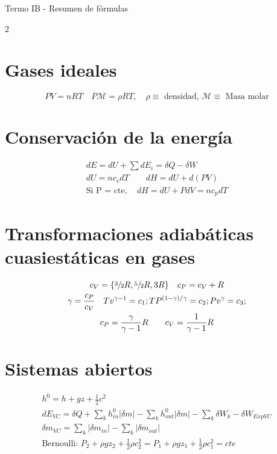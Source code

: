 \documentclass[9pt]{article}
\begin{document}
\begin{center}
    {\Large{Termo IB - Resumen de fórmulas}}
\end{center}

\begin{multicols}{2}



\section{Gases ideales}
\begin{equation*}
    PV = nRT \quad P\mathcal{M}  = \rho RT,\quad \text{$\rho\equiv$ densidad, $\mathcal{M}\equiv$ Masa molar}
\end{equation*}

\section{Conservación de la energía}

\begin{gather*}
    dE = dU + \sum dE_{i} = \delta Q - \delta W\\
    dU = nc_vdT \qquad dH = dU + d(PV)\\
    \text{Si P = cte},\quad dH = dU +PdV = nc_pdT
\end{gather*}

\section{Transformaciones adiabáticas cuasiestáticas en gases}
\begin{gather*}
    c_V = \{\sfrac{3}{2}R,\sfrac{5}{2}R,3R\} \quad c_P = c_V + R\\
    \gamma = \frac{c_P}{c_V} \quad Tv^{\gamma-1}=c_1; TP^{(1-\gamma)/\gamma}=c_2; Pv^\gamma=c_3;\\
    c_P=\frac{\gamma}{\gamma-1}R \qquad c_V = \frac{1}{\gamma-1}R
\end{gather*}

\section{Sistemas abiertos}
\begin{gather*}
    h^0 = h+gz +\frac{1}{2}c^2\\
    dE_{VC} = \delta Q + \sum_{k}h_{in}^0\left|\delta m\right| - \sum_{k}h_{out}^0\left|\delta m\right| - \sum_{k} \delta W_k -\delta W_{ExpVC}\\
    \delta m_{VC} = \sum_{k} \left|\delta m_{in}\right| - \sum_{k} \left|\delta m_{out}\right|\\
    \text{Bernoulli: } P_2+\rho gz_2 + \frac{1}{2}\rho c_2^2 = P_1+\rho gz_1 + \frac{1}{2}\rho c_1^2 = cte
\end{gather*}


\end{multicols}
\end{document}
